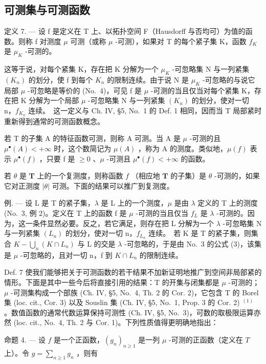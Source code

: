 \subsection{可测集与可测函数}

定义 7. --- 设 f 是定义在 T 上、以拓扑空间 F（Hausdorff 与否均可）为值的函数。则称 f 对测度 \(\mu\) 可测（或称 \(\mu\) -可测），如果对 T 的每个紧子集 K，函数 \(f_{K}\) 是 \(\mu_{K}\) -可测的。

这等于说，对每个紧集 K，存在把 K 分解为一个 \(\mu_{K}\) -可忽略集 N 与一列紧集 \((K_{n})\) 的划分，使 f 到每个 \(K_{n}\) 的限制连续。由于说 N 是 \(\mu_{K}\) -可忽略的与说它局部 \(\mu\) -可忽略是等价的 (No.~4)，可见 f 是 \(\mu\) -可测的当且仅当对每个紧集 K，存在把 K 分解为一个局部 \(\mu\) -可忽略集 N 与一列紧集 \((K_{n})\) 的划分，使对一切 n，\(f_{K_{n}}\) 连续。~这一定义与 Ch. IV, §5, No.~1 的 Def. 1 相同，因而当 T 局部紧时重新得到通常的可测函数概念。

若 T 的子集 A 的特征函数可测，则称 A 可测。当 A 是 \(\mu\) -可测的且 \(\mu^{\bullet}(A) < +\infty\) 时，这个数简记为 \(\mu(A)\) ，称为 A 的测度。类似地，\(\mu(f)\) 表示 \(\mu^{\bullet}(f)\) ，只要 f 是 \(\geqslant 0\) 、\(\mu\) -可测且 \(\mu^{\bullet}(f) < +\infty\) 的函数。

若 \(\theta\) 是 \(\mathbf{T}\) 上的一个复测度，则称函数 \(f\) （相应地 \(\mathbf{T}\) 的子集）是 \(\theta\) -可测的，如果它对正测度 \(|\theta|\) 可测。下面的结果可以推广到复测度。

例. --- 设 L 是 T 的紧子集，\(\lambda\) 是 L 上的一个测度，\(\mu\) 是由 \(\lambda\) 定义的 T 上的测度 (No.~3, 例 2)。定义在 T 上的函数 f 是 \(\mu\) -可测的当且仅当 \(f_{L}\) 是 \(\lambda\) -可测的。因为，这一条件显然必要。反之，若它满足，则存在把 L 分解为一个 \(\lambda\) -可忽略集 N 与一列紧集 \((L_{n})\) 的划分，使对一切 n，\(f_{L_{n}}\) 连续。~若 K 是 T 的紧子集，则集合 \(K - \bigcup_{n}(K \cap L_{n})\)
与 L 的交是 \(\lambda\) -可忽略的，于是由 No.~3 的公式 (3)，该集是 \(\mu\) -可忽略的，且对一切 n，f 到 \(K \cap L_{n}\) 的限制连续。

Def. 7 使我们能够把关于可测函数的若干结果不加新证明地推广到空间非局部紧的情形。下面是其中一些今后将直接引用的结果：T 的开集与闭集都是 \(\mu\) -可测的；\(\mu\) -可测集构成一个部族 (Ch. IV, §5, No.~4, Th. 2 的 Cor. 2)，它包含 T 的 Borel 集 (loc. cit., Cor. 3) 以及 Souslin 集 (Ch. IV, §5, No.~1, Prop. 3 的 Cor. 2) \(^{(1)}\) 。数值函数的通常代数运算保持可测性 (Ch. IV, §5, No.~3)，可数的取极限运算亦然 (loc. cit., No.~4, Th. 2 与 Cor. 1)。下列性质值得更明确地指出：

命题 4. --- 设 \(f\) 是一个正函数，\((g_n)_{n \geqslant 1}\) 是一列 \(\mu\) -可测的正函数（定义在 \(T\) 上）。令 \(g = \sum_{n \geqslant 1} g_n\) ，则有

